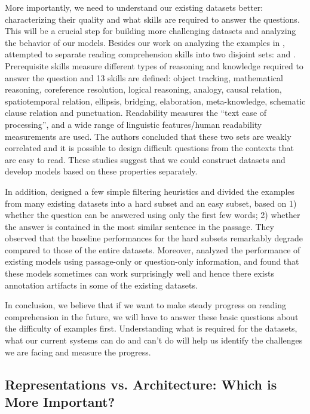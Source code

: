 More importantly, we need to understand our existing datasets better: characterizing their quality and what skills are required to answer the questions. This will be a crucial step for building more challenging datasets and analyzing the behavior of our models. Besides our work on analyzing the  examples in ,  attempted to separate reading comprehension skills into two disjoint sets:  and .  Prerequisite skills measure different types of reasoning and knowledge required to answer the question and 13 skills are defined: object tracking, mathematical reasoning, coreference resolution, logical reasoning, analogy, causal relation, spatiotemporal relation, ellipsis, bridging, elaboration, meta-knowledge, schematic clause relation and punctuation. Readability measures the “text ease of processing”, and a wide range of linguistic features/human readability measurements are used. The authors concluded that these two sets are weakly correlated and it is possible to design difficult questions from the contexts that are easy to read. These studies suggest that we could construct datasets and develop models based on these properties separately.

In addition,  designed a few simple filtering heuristics and divided the examples from many existing datasets into a hard subset and an easy subset, based on 1) whether the question can be answered using only the first few words; 2) whether the answer is contained in the most similar sentence in the passage. They observed that the baseline performances for the hard subsets remarkably degrade compared to those of the entire datasets. Moreover,  analyzed the performance of existing models using passage-only or question-only information, and found that these models sometimes can work surprisingly well and hence there exists annotation artifacts in some of the existing datasets.

In conclusion, we believe that if we want to make steady progress on reading comprehension in the future, we will have to answer these basic questions about the difficulty of examples first. Understanding what is required for the datasets, what our current systems can do and can't do will help us identify the challenges we are facing and measure the progress.

\subsection{Representations vs. Architecture: Which is More Important?}
\label{sec:rep-vs-arch}

